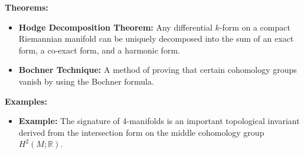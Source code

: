 \textbf{Theorems:}
\begin{itemize}
    \item \textbf{Hodge Decomposition Theorem:} Any differential $k$-form on a compact Riemannian manifold can be uniquely decomposed into the sum of an exact form, a co-exact form, and a harmonic form.
    \item \textbf{Bochner Technique:} A method of proving that certain cohomology groups vanish by using the Bochner formula.
\end{itemize}

\textbf{Examples:}
\begin{itemize}
    \item \textbf{Example:} The signature of 4-manifolds is an important topological invariant derived from the intersection form on the middle cohomology group $H^2(M; \mathbb{R})$.
\end{itemize}
